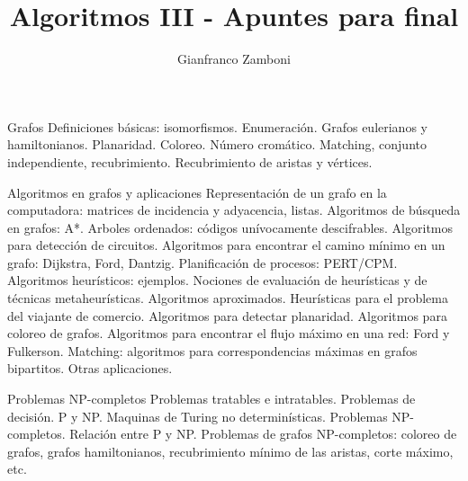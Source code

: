 


\title{Algoritmos III - Apuntes para final}
\author{Gianfranco Zamboni}

\usepackage[backend=biber,style=chem-acs,sorting=none]{biblatex}
\nocite{*}




\setcounter{tocdepth}{3}




\maketitle
\tableofcontents

\newpage

\newpage


\newpage


\newpage


\newpage

\color{red}

Grafos Definiciones básicas: isomorfismos. Enumeración. Grafos eulerianos y hamiltonianos. Planaridad. Coloreo. Número cromático. Matching, conjunto independiente, recubrimiento. Recubrimiento de aristas y vértices.

Algoritmos en grafos y aplicaciones Representación de un grafo en la computadora: matrices de incidencia y adyacencia, listas. Algoritmos de búsqueda en grafos: A*. Arboles ordenados: códigos unívocamente descifrables. Algoritmos para detección de circuitos. Algoritmos para encontrar el camino mínimo en un grafo: Dijkstra, Ford, Dantzig. Planificación de procesos: PERT/CPM. Algoritmos heurísticos: ejemplos. Nociones de evaluación de heurísticas y de técnicas metaheurísticas. Algoritmos aproximados. Heurísticas para el problema del viajante de comercio. Algoritmos para detectar planaridad. Algoritmos para coloreo de grafos. Algoritmos para encontrar el flujo máximo en una red: Ford y Fulkerson. Matching: algoritmos para correspondencias máximas en grafos bipartitos. Otras aplicaciones.



Problemas NP-completos Problemas tratables e intratables. Problemas de decisión. P y NP. Maquinas de Turing no determinísticas. Problemas NP-completos. Relación entre P y NP. Problemas de grafos NP-completos: coloreo de grafos, grafos hamiltonianos, recubrimiento mínimo de las aristas, corte máximo, etc.


